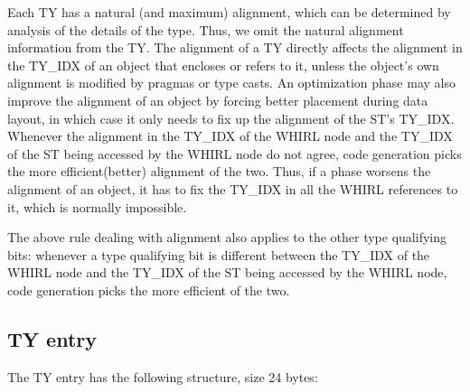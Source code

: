 Each
%
TY has a natural (and maximum) alignment, which can be determined
by analysis of the details of the type. Thus, we omit the natural
alignment information from the TY. The alignment of a
%
TY directly
affects the alignment in the
%
TY\_IDX of an object that encloses or
refers to it, unless the object's own alignment is modified by pragmas
or type casts. An
optimization phase may also improve the alignment of an object by
forcing better placement during data layout, in which case it only
needs to fix up the alignment of the ST's TY\_IDX. Whenever the
alignment in the
%
TY\_IDX of the WHIRL node and the
%
TY\_IDX of the
%
ST
being accessed by the
WHIRL node do not agree, code generation picks the more
efficient(better) alignment of the two. Thus, if a phase worsens the
alignment of an object, it has to fix the
%
TY\_IDX in all the WHIRL
references to it, which is normally impossible.

The above rule dealing with alignment also applies to the other type
qualifying bits: whenever a type qualifying bit is different between
the
%
TY\_IDX of the WHIRL node and the
%
TY\_IDX of the
%
ST being accessed
by the WHIRL node, code generation picks the more efficient of the two.

\subsection{TY entry}

The
%
TY entry has the following structure, size 24 bytes:


